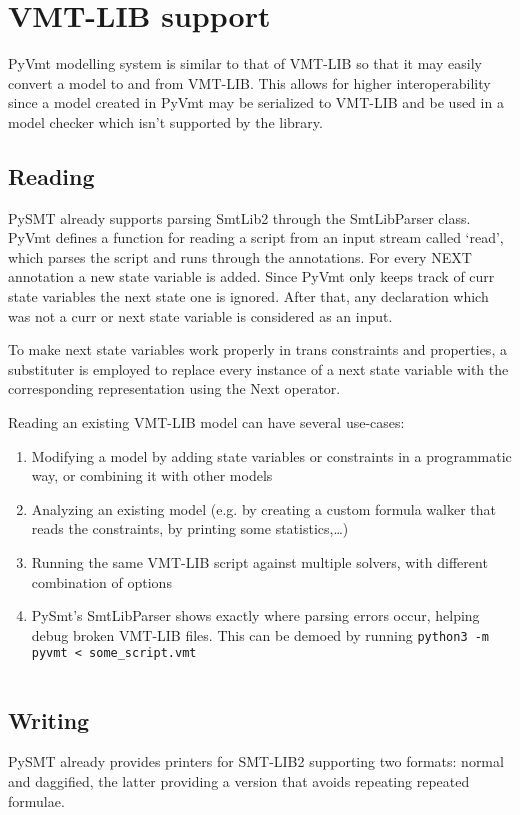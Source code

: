 \chapter{VMT-LIB support}
PyVmt modelling system is similar to that of VMT-LIB so that it may easily convert a model to and from VMT-LIB.
This allows for higher interoperability since a model created in PyVmt may be serialized to VMT-LIB and be used in a model checker which isn't supported by the library.

\section{Reading}
PySMT already supports parsing SmtLib2 through the SmtLibParser class.
PyVmt defines a function for reading a script from an input stream called `read', which parses the script and runs through the annotations.
For every NEXT annotation a new state variable is added. Since PyVmt only keeps track of curr state variables the next state one is ignored.
After that, any declaration which was not a curr or next state variable is considered as an input.

To make next state variables work properly in trans constraints and properties, a substituter is employed to replace every instance of a next state variable with the corresponding representation using the Next operator.

Reading an existing VMT-LIB model can have several use-cases:
\begin{enumerate}
    \item Modifying a model by adding state variables or constraints in a programmatic way, or combining it with other models
    \item Analyzing an existing model (e.g. by creating a custom formula walker that reads the constraints, by printing some statistics,\dots)
    \item Running the same VMT-LIB script against multiple solvers, with different combination of options
    \item PySmt's SmtLibParser shows exactly where parsing errors occur, helping debug broken VMT-LIB files. This can be demoed by running \texttt{python3 -m pyvmt < some_script.vmt}
\end{enumerate}
\inputminted[firstline=11, lastline=34]{python3}{py/vmtlib_support.py}

\section{Writing}
PySMT already provides printers for SMT-LIB2 supporting two formats: normal and daggified, the latter providing a version that avoids repeating repeated formulae.

